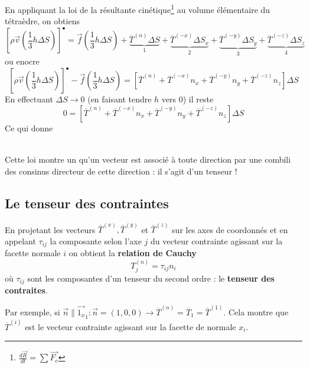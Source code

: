 En appliquant la loi de la résultante cinétique\footnote{$\frac{d\vec{R}}{dt} = \sum \vec{F_e}$} au volume 
élémentaire du tétraèdre, on obtiens 
\begin{equation}
	\left[\rho\vec{v}\left(\dfrac{1}{3}h\Delta S\right)\right]^{\bullet} = \vec{f}\left(\dfrac{1}{3}h\Delta S\right) +
	\underbrace{\overline{T}^{(n)}\Delta S}_{1} + \underbrace{\overline{T}^{(-x)}\Delta S_x}_{2} + 
	\underbrace{\overline{T}^{(-y)}\Delta S_y}_{3} + \underbrace{\overline{T}^{(-z)}\Delta S_z}_{4}
\end{equation}
ou enocre
\begin{equation}
	\left[\rho\vec{v}\left(\dfrac{1}{3}h\Delta S\right)\right]^{\bullet} -\vec{f}\left(\dfrac{1}{3}h\Delta S\right)
	= \left[\overline{T}^{(n)}+\overline{T}^{(-x)}n_x + \overline{T}^{(-y)}n_y
	+ \overline{T}^{(-z)}n_z\right]\Delta S
\end{equation}
En effectuant $\Delta S \rightarrow 0$ (en faisant tendre $h$ vers 0) il reste
\begin{equation}
	0 = \left[\overline{T}^{(n)}+\overline{T}^{(-x)}n_x +\overline{T}^{(-y)}n_y+\overline{T}^{(-z)}n_z\right]
	\Delta S
\end{equation}
Ce qui donne\\
    
\ 
    
Cette loi montre un qu'un vecteur est associé à toute direction par une combili des consinus directeur de
cette direction : il s'agit d'un tenseur !
    
\subsection{Le tenseur des contraintes}
En projetant les vecteurs $\overline{T}^{(x)}, \overline{T}^{(y)}$ et $\overline{T}^{(z)}$ sur les axes de
coordonnés et en appelant $\tau_{ij}$ la composante selon l'axe $j$ du vecteur contrainte agissant sur la 
facette normale $i$ on obtient la \textbf{relation de Cauchy}
\begin{equation}
	T_j^{(n)} = \tau_{ij}n_i
\end{equation}
où $\tau_{ij}$ sont les composantes d'un tenseur du second ordre : le \textbf{tenseur des contraites}.
    
\newpage
Par exemple, si $\vec{n} \parallel \vec{1_x}_{1} : \vec{n} = (1,0,0) \rightarrow  \overline{T}^{(n)} =
\overline{T}_1 =  \overline{T}^{(1)}$. Cela montre que $ \overline{T}^{(i)}$ est le vecteur contrainte
agissant sur la facette de normale $x_i$.\\
     
